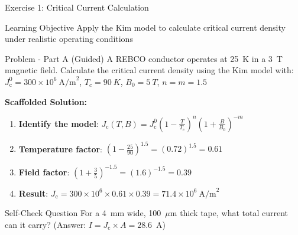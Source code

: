 \documentclass[aspectratio=169,xcolor={table,dvipsnames}]{beamer}
\newcommand{\Tesla}[1]{#1~T}
\newcommand{\Kelvin}[1]{#1~K}
\newcommand{\Jc}{J_\text{c}}
\begin{document}
\begin{frame}{Exercise 1: Critical Current Calculation}
    \begin{block}{Learning Objective}
        Apply the Kim model to calculate critical current density under realistic operating conditions
    \end{block}
    
    \begin{block}{Problem - Part A (Guided)}
        A REBCO conductor operates at \Kelvin{25} in a \Tesla{3} magnetic field.
        Calculate the critical current density using the Kim model with:
        $\Jc^0 = 300 \times 10^6~\text{A/m}^2$, $T_c = \Kelvin{90}$, $B_0 = \Tesla{5}$, $n = m = 1.5$
    \end{block}
    
    \textbf{Scaffolded Solution:}
    \begin{enumerate}
        \item \textbf{Identify the model}: $\Jc(T,B) = \Jc^0 \left(1-\frac{T}{T_c}\right)^{n} \left(1+\frac{B}{B_0}\right)^{-m}$
        \item \textbf{Temperature factor}: $\left(1-\frac{25}{90}\right)^{1.5} = (0.72)^{1.5} = 0.61$
        \item \textbf{Field factor}: $\left(1+\frac{3}{5}\right)^{-1.5} = (1.6)^{-1.5} = 0.39$
        \item \textbf{Result}: $\Jc = 300 \times 10^6 \times 0.61 \times 0.39 = 71.4 \times 10^6~\text{A/m}^2$
    \end{enumerate}
    
        \begin{alertblock}{Self-Check Question}
        For a 4~mm wide, 100~\(\mu\)m thick tape, what total current can it carry? (Answer: $I = \Jc \times A = 28.6$~A)
    \end{alertblock}
\end{frame}
\end{document}
